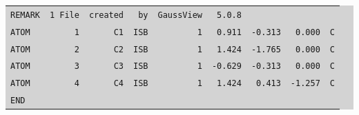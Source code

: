 \colorbox{lightgray}{
\begin{tabular}{l *{8}{r}}
  \texttt{REMARK} & \texttt{1 File} & \texttt{created}  & \texttt{by} & \texttt{GaussView} & \texttt{5.0.8} & & & \\
  \texttt{ATOM} & \texttt{1} & \texttt{C1} & \texttt{ISB} & \texttt{1} & \texttt{0.911} & \texttt{-0.313} & \texttt{0.000}  & \texttt{C} \\
  \texttt{ATOM} & \texttt{2} & \texttt{C2} & \texttt{ISB} & \texttt{1} & \texttt{1.424} & \texttt{-1.765} & \texttt{0.000}  & \texttt{C} \\
  \texttt{ATOM} & \texttt{3} & \texttt{C3} & \texttt{ISB} & \texttt{1} & \texttt{-0.629} & \texttt{-0.313} & \texttt{0.000}  & \texttt{C} \\
  \texttt{ATOM} & \texttt{4} & \texttt{C4} & \texttt{ISB} & \texttt{1} & \texttt{1.424} & \texttt{0.413} & \texttt{-1.257} & \texttt{C} \\
  \multicolumn{9}{l}{\texttt{END}} \\
\end{tabular} 
} \\\\


